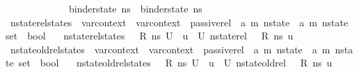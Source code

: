 \begin{isabellebody}
\ \ \ \ \ \ \ \ \ \ \ \ {\isasymand}\ binder{\isacharunderscore}{\kern0pt}state\ ns{}\ {\isacharequal}{\kern0pt}\ binder{\isacharunderscore}{\kern0pt}state\ ns{}{\isacharparenright}{\kern0pt}{\isachardoublequoteclose}\isanewline
\isanewline
{}\isamarkupfalse%
\ nstate{\isacharunderscore}{\kern0pt}rel{\isacharunderscore}{\kern0pt}states\ {\isacharcolon}{\kern0pt}{\isacharcolon}{\kern0pt}\ {\isachardoublequoteopen}var{\isacharunderscore}{\kern0pt}context\ {\isasymRightarrow}\ var{\isacharunderscore}{\kern0pt}context\ {\isasymRightarrow}\ passive{\isacharunderscore}{\kern0pt}rel\ {\isasymRightarrow}\ {\isacharparenleft}{\kern0pt}{\isacharprime}{\kern0pt}a{\isacharcomma}{\kern0pt}\ {\isacharprime}{\kern0pt}m{\isacharparenright}{\kern0pt}\ nstate\ {\isasymRightarrow}\ {\isacharparenleft}{\kern0pt}{\isacharprime}{\kern0pt}a{\isacharcomma}{\kern0pt}\ {\isacharprime}{\kern0pt}m{\isacharparenright}{\kern0pt}\ nstate\ set\ {\isasymRightarrow}\ bool{\isachardoublequoteclose}\isanewline
\ \ \ {\isachardoublequoteopen}nstate{\isacharunderscore}{\kern0pt}rel{\isacharunderscore}{\kern0pt}states\ {\isasymLambda}\ {\isasymLambda}{\isacharprime}{\kern0pt}\ R\ ns\ U\ {\isasymequiv}\ {\isasymforall}u\ {\isasymin}\ U{\isachardot}{\kern0pt}\ nstate{\isacharunderscore}{\kern0pt}rel\ {\isasymLambda}\ {\isasymLambda}{\isacharprime}{\kern0pt}\ R\ ns\ u{\isachardoublequoteclose}\isanewline
\isanewline
{}\isamarkupfalse%
\ nstate{\isacharunderscore}{\kern0pt}old{\isacharunderscore}{\kern0pt}rel{\isacharunderscore}{\kern0pt}states\ {\isacharcolon}{\kern0pt}{\isacharcolon}{\kern0pt}\ {\isachardoublequoteopen}var{\isacharunderscore}{\kern0pt}context\ {\isasymRightarrow}\ var{\isacharunderscore}{\kern0pt}context\ {\isasymRightarrow}\ passive{\isacharunderscore}{\kern0pt}rel\ {\isasymRightarrow}\ {\isacharparenleft}{\kern0pt}{\isacharprime}{\kern0pt}a{\isacharcomma}{\kern0pt}\ {\isacharprime}{\kern0pt}m{\isacharparenright}{\kern0pt}\ nstate\ {\isasymRightarrow}\ {\isacharparenleft}{\kern0pt}{\isacharprime}{\kern0pt}a{\isacharcomma}{\kern0pt}\ {\isacharprime}{\kern0pt}m{\isacharparenright}{\kern0pt}\ nstate\ set\ {\isasymRightarrow}\ bool{\isachardoublequoteclose}\isanewline
\ \ \ {\isachardoublequoteopen}nstate{\isacharunderscore}{\kern0pt}old{\isacharunderscore}{\kern0pt}rel{\isacharunderscore}{\kern0pt}states\ {\isasymLambda}\ {\isasymLambda}{\isacharprime}{\kern0pt}\ R\ ns\ U\ {\isasymequiv}\ {\isasymforall}u\ {\isasymin}\ U{\isachardot}{\kern0pt}\ nstate{\isacharunderscore}{\kern0pt}old{\isacharunderscore}{\kern0pt}rel\ {\isasymLambda}\ {\isasymLambda}{\isacharprime}{\kern0pt}\ R\ ns\ u{\isachardoublequoteclose}\isanewline

\end{isabellebody}
